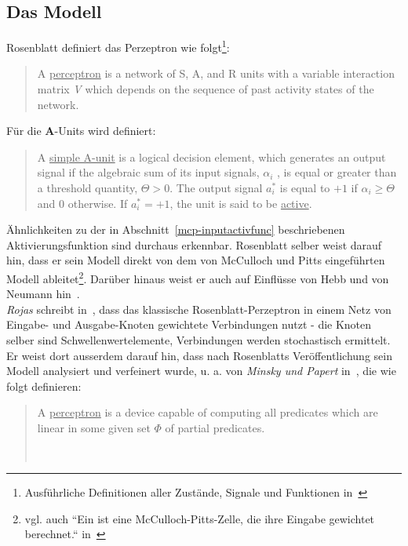 \subsection{Das Modell}

Rosenblatt definiert das Perzeptron wie folgt\footnote{
    Ausführliche Definitionen aller Zustände, Signale und Funktionen in~\cite[79 - 94]{Ros62}
}:

\blockquote[{\cite[83 ``DEFINITION 17`` (Hervorhebung i.O.)]{Ros62}}]{
    A \underline{perceptron} is a network of S, A, and R units with a variable interaction matrix \textit{V} which depends on the
    sequence of past activity states of the network.
}

Für die \textbf{A}-Units wird definiert:

\blockquote[{\cite[81  ``DEFINITION 9`` (Hervorhebung i.O.)]{Ros62}}]{
    A \underline{simple A-unit} is a logical decision element, which
    generates an output signal if the algebraic sum of its
    input signals, $\alpha_i$ , is equal or greater than a threshold
    quantity, $\Theta > 0$. The output signal $a^*_i$ is equal to $+1$ if $\alpha_i \geq \Theta$ and $0$ otherwise. If $a^*_i = +1$,
    the unit is said to be \underline{active}.
}


Ähnlichkeiten zu der in Abschnitt~\ref{mcp-inputactivfunc} beschriebenen Aktivierungsfunktion sind durchaus erkennbar.
Rosenblatt selber weist darauf hin, dass er sein Modell direkt von dem von McCulloch und Pitts eingeführten Modell ableitet\footnote{
    vgl. auch ``Ein  ist eine McCulloch-Pitts-Zelle, die ihre Eingabe gewichtet berechnet.`` in~\cite[57, ``Definition 3.1`` (Hervorhebungen i.O.)]{Roj93}
}. Darüber hinaus weist er auch auf Einflüsse von Hebb und von Neumann hin~\cite[5]{Ros62}.\\


\textit{Rojas} schreibt in~\cite[51]{Roj93}, dass das klassische Rosenblatt-Perzeptron in einem Netz von Eingabe- und Ausgabe-Knoten gewichtete Verbindungen nutzt - die Knoten selber sind Schwellenwertelemente, Verbindungen werden stochastisch ermittelt.
Er weist dort ausserdem darauf hin, dass nach Rosenblatts Veröffentlichung sein Modell analysiert und verfeinert wurde, u. a. von \textit{Minsky und Papert} in~\cite{MP88}, die wie folgt definieren:

\blockquote[{~\cite[12, Hervorhebung i.O.]{MP88}}]{
    A \underline{perceptron} is a device capable of computing all predicates which are linear in some given set $\Phi$ of partial predicates.
}

